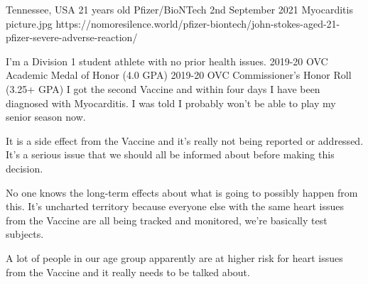           {Tennessee, USA}
          {21 years old}
          {Pfizer/BioNTech}
          {2nd September 2021}
          {Myocarditis}
          {picture.jpg}
          {https://nomoresilence.world/pfizer-biontech/john-stokes-aged-21-pfizer-severe-adverse-reaction/}
          {
                
I'm a Division 1 student athlete with no prior health issues. 2019-20 OVC
Academic Medal of Honor (4.0 GPA) 2019-20 OVC Commissioner's Honor Roll (3.25+
GPA) I got the second Vaccine and within four days I have been diagnosed with
Myocarditis. I was told I probably won't be able to play my senior season now.

It is a side effect from the Vaccine and it's really not being reported or
addressed. It's a serious issue that we should all be informed about before
making this decision.

No one knows the long-term effects about what is going to possibly happen from
this. It's uncharted territory because everyone else with the same heart issues
from the Vaccine are all being tracked and monitored, we're basically test
subjects.

A lot of people in our age group apparently are at higher risk for heart issues
from the Vaccine and it really needs to be talked about.

}
